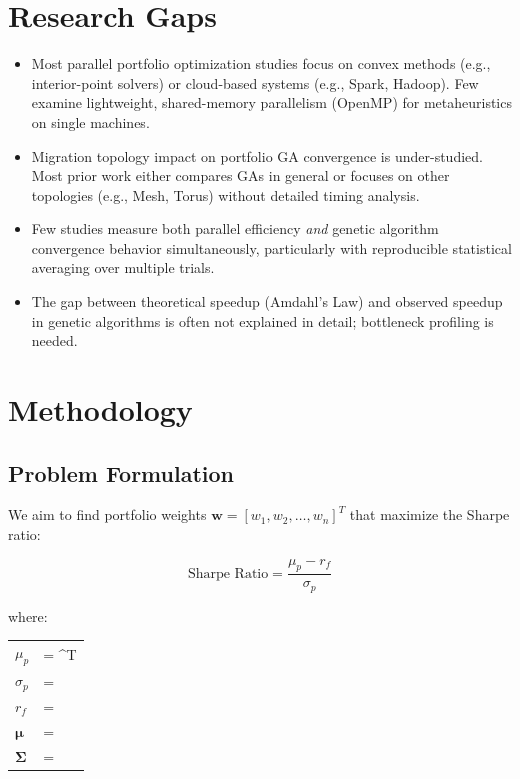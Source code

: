 \documentclass[12pt,a4paper]{article}
\makeatletter
\newenvironment{conditions}
{\par\vspace{\abovedisplayskip}\noindent\begin{tabular}{>{$}l<{$} @{${}={}$} l}}{\end{tabular}\par\vspace{\belowdisplayskip}}
\makeatother
\begin{document}
\newpage
\section{Research Gaps}

\begin{itemize}
	\item Most parallel portfolio optimization studies focus on convex methods (e.g., interior-point solvers) or cloud-based systems (e.g., Spark, Hadoop). Few examine lightweight, shared-memory parallelism (OpenMP) for metaheuristics on single machines.
	
	\item Migration topology impact on portfolio GA convergence is under-studied. Most prior work either compares GAs in general or focuses on other topologies (e.g., Mesh, Torus) without detailed timing analysis.
	
	\item Few studies measure both parallel efficiency \textit{and} genetic algorithm convergence behavior simultaneously, particularly with reproducible statistical averaging over multiple trials.
	
	\item The gap between theoretical speedup (Amdahl's Law) and observed speedup in genetic algorithms is often not explained in detail; bottleneck profiling is needed.
\end{itemize}

\newpage
\section{Methodology}

\subsection{Problem Formulation}

We aim to find portfolio weights $\mathbf{w} = [w_1, w_2, \ldots, w_n]^T$ that maximize the Sharpe ratio:

\begin{equation}
\text{Sharpe Ratio} = \frac{\mu_p - r_f}{\sigma_p}
\label{eq:sharpe}
\end{equation}

\noindent where:
\begin{conditions}
\mu_p & = \mathbf{w}^T \boldsymbol{\mu} \quad \text{(portfolio mean return)} \\
\sigma_p & = \sqrt{\mathbf{w}^T \boldsymbol{\Sigma} \mathbf{w}} \quad \text{(portfolio std.~deviation)} \\
r_f & = \text{daily risk-free rate} \\
\boldsymbol{\mu} & = \text{vector of mean daily returns} \\
\boldsymbol{\Sigma} & = \text{covariance matrix of daily returns}
\end{conditions}
\end{document}
